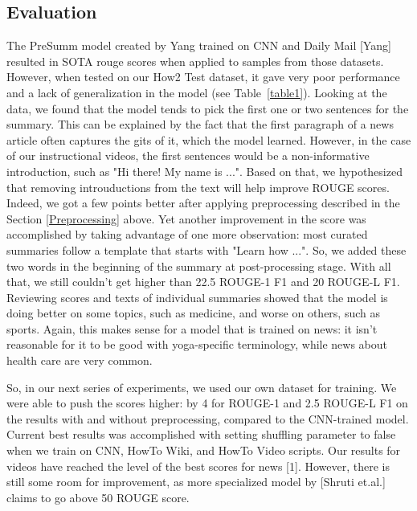 \documentclass{article}
\begin{document}
\subsection{Evaluation}
The PreSumm model created by Yang trained on CNN and Daily Mail [Yang] resulted in SOTA rouge scores when applied to samples from those datasets. However, when tested on our How2 Test dataset, it gave very poor performance and a lack of generalization in the model (see Table~\ref{table1}). Looking at the data, we found that the model tends to pick the first one or two sentences for the summary. This can be explained by the fact that the first paragraph of a news article often captures the gits of it, which the model learned. However, in the case of our instructional videos, the first sentences would be a non-informative introduction, such as "Hi there! My name is ...". Based on that, we hypothesized that removing introuductions from the text will help improve ROUGE scores. Indeed, we got a few points better after applying  preprocessing described in the Section \ref{Preprocessing} above. Yet another improvement in the score was accomplished by taking advantage of one more observation: most curated summaries follow a template that starts with "Learn how ...". So, we added these two words in the beginning of the summary at post-processing stage. With all that, we still couldn't get higher than 22.5 ROUGE-1 F1 and 20 ROUGE-L F1. Reviewing scores and texts of individual summaries showed that the model is doing better on some topics, such as medicine, and worse on others, such as sports. Again, this makes sense for a model that is trained on news: it isn't reasonable for it to be good with yoga-specific terminology, while news about health care are very common.

So, in our next series of experiments, we used our own dataset for training. We were able to push the scores higher: by 4 for ROUGE-1 and 2.5 ROUGE-L F1 on the results with and without preprocessing, compared to the CNN-trained model. Current best results was accomplished with setting shuffling parameter to false when we train on CNN, HowTo Wiki, and HowTo Video scripts. Our results for videos have reached the level of the best scores for news [1]. However, there is still some  room for improvement, as more specialized model by [Shruti et.al.] claims to go above 50 ROUGE score.
\end{document}
